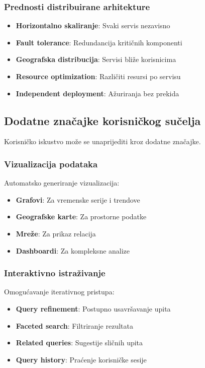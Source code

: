 \subsubsection{Prednosti distribuirane arhitekture}

\begin{itemize}
    \item \textbf{Horizontalno skaliranje}: Svaki servis nezavisno
    \item \textbf{Fault tolerance}: Redundancija kritičnih komponenti
    \item \textbf{Geografska distribucija}: Servisi bliže korisnicima
    \item \textbf{Resource optimization}: Različiti resursi po servisu
    \item \textbf{Independent deployment}: Ažuriranja bez prekida
\end{itemize}

\subsection{Dodatne značajke korisničkog sučelja}

Korisničko iskustvo može se unaprijediti kroz dodatne značajke.

\subsubsection{Vizualizacija podataka}

Automatsko generiranje vizualizacija:

\begin{itemize}
    \item \textbf{Grafovi}: Za vremenske serije i trendove
    \item \textbf{Geografske karte}: Za prostorne podatke
    \item \textbf{Mreže}: Za prikaz relacija
    \item \textbf{Dashboardi}: Za kompleksne analize
\end{itemize}

\subsubsection{Interaktivno istraživanje}

Omogućavanje iterativnog pristupa:

\begin{itemize}
    \item \textbf{Query refinement}: Postupno usavršavanje upita
    \item \textbf{Faceted search}: Filtriranje rezultata
    \item \textbf{Related queries}: Sugestije sličnih upita
    \item \textbf{Query history}: Praćenje korisničke sesije
\end{itemize}

